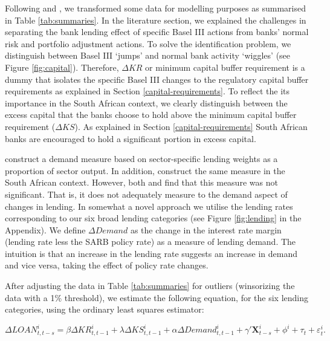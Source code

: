 \documentclass[
  12,
]{article}
\begin{document}
Following \citet{fang2020bank} and \citet{aiyar2016does}, we transformed some data for modelling purposes as summarised in Table \ref{tab:summaries}. In the literature section, we explained the challenges in separating the bank lending effect of specific Basel III actions from banks' normal risk and portfolio adjustment actions. To solve the identification problem, we distinguish between Basel III `jumps' and normal bank activity `wiggles' (see Figure \ref{fig:capital}). Therefore, \(\Delta KR\) or minimum capital buffer requirement is a dummy that isolates the specific Basel III changes to the regulatory capital buffer requirements as explained in Section \ref{capital-requirements}. To reflect the its importance in the South African context, we clearly distinguish between the excess capital that the banks choose to hold above the minimum capital buffer requirement (\(\Delta KS\)). As explained in Section \ref{capital-requirements} South African banks are encouraged to hold a significant portion in excess capital.

\citet{fang2020bank} construct a demand measure based on sector-specific lending weights as a proportion of sector output. In addition, \citet{neryvia2023} construct the same measure in the South African context. However, both \citet{fang2020bank} and \citet{neryvia2023} find that this measure was not significant. That is, it does not adequately measure to the demand aspect of changes in lending. In somewhat a novel approach we utilise the lending rates corresponding to our six broad lending categories (see Figure \ref{fig:lending} in the Appendix). We define \(\Delta Demand\) as the change in the interest rate margin (lending rate less the SARB policy rate) as a measure of lending demand. The intuition is that an increase in the lending rate suggests an increase in demand and vice versa, taking the effect of policy rate changes.

After adjusting the data in Table \ref{tab:summaries} for outliers (winsorizing the data with a 1\% threshold), we estimate the following equation, for the six lending categories, using the ordinary least squares estimator:

\[
\Delta LOAN^i_{t, t-s} = \beta \Delta KR^i_{t, t-1} + \lambda \Delta KS^i_{t, t-1} + \alpha \Delta Demand^i_{t, t-1} + \gamma'  \pmb{X}^i_{t-s} + \phi^i + \tau_t + \varepsilon^i_t.
\]
\end{document}
